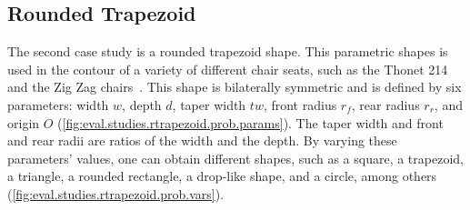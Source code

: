 \subsection{Rounded Trapezoid}%
\label{sec:eval.studies.rtrapezoid}

The second case study is a rounded trapezoid shape.  This parametric shapes is
used in the contour of a variety of different chair seats, such as the Thonet
214 and the Zig Zag chairs~\cite{Garcia:2018:SGDTIMCG}.  This shape is
bilaterally symmetric and is defined by six parameters: width $w$, depth $d$,
taper width $tw$, front radius $r_f$, rear radius $r_r$, and origin $O$
(\cref{fig:eval.studies.rtrapezoid.prob.params}).  The taper width and front and
rear radii are ratios of the width and the depth.  By varying these parameters'
values, one can obtain different shapes, such as a square, a trapezoid, a
triangle, a rounded rectangle, a drop-like shape, and a circle, among others
(\cref{fig:eval.studies.rtrapezoid.prob.vars}).

